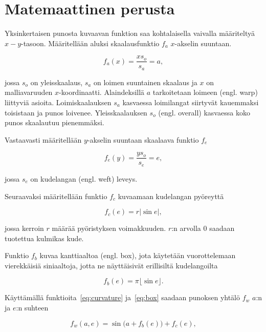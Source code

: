 \documentclass[utf8,bachelor]{gradu3}
\begin{document}
\chapter{Matemaattinen perusta}

Yksinkertaisen punosta kuvaavan funktion saa kohtalaisella vaivalla määriteltyä $x-y$-tasoon. Määritellään aluksi skaalausfunktio $f_a$ $x$-akselin suuntaan.

\begin{equation}
\label{eq:warp}
f_a(x) = \frac{xs_o}{s_a} = a,
\end{equation}

jossa $s_o$ on yleisskaalaus, $s_a$ on loimen suuntainen skaalaus ja $x$ on malliavaruuden $x$-koordinaatti. Alaindeksillä $a$ tarkoitetaan loimeen (engl. warp) liittyviä asioita. Loimiskaalauksen $s_a$ kasvaessa loimilangat siirtyvät kauemmaksi toisistaan ja punos loivenee. Yleisskaalauksen $s_o$ (engl. overall) kasvaessa koko punos skaalautuu pienemmäksi.

Vastaavasti määritellään $y$-akselin suuntaan skaalaava funktio $f_e$

\begin{equation}
\label{eq:weft}
f_e(y) = \frac{ys_o}{s_e} = e,
\end{equation}

jossa $s_e$ on kudelangan (engl. weft) leveys.

Seuraavaksi määritellään funktio $f_c$ kuvaamaan kudelangan pyöreyttä

\begin{equation}
\label{eq:curvature}
f_c(e) = r\lvert\sin{e}\rvert,
\end{equation}

jossa kerroin $r$ määrää pyöristyksen voimakkuuden. $r$:n arvolla $0$ saadaan tuotettua kulmikas kude.

Funktio $f_b$ kuvaa kanttiaaltoa (engl. box), jota käytetään vuorottelemaan vierekkäisiä siniaaltoja, jotta ne näyttäisivät erillisiltä kudelangoilta

\begin{equation}
\label{eq:box}
f_b(e) = \pi \lfloor \sin{e} \rfloor.
\end{equation}

Käyttämällä funktioita~\eqref{eq:curvature} ja~\eqref{eq:box} saadaan punoksen yhtälö $f_w$ $a$:n ja $e$:n suhteen 

\begin{equation*} 
\label{eq:weave_ae}
f_w(a,e) = \sin{\big(a + f_b(e)\big)} + f_c(e),
\end{equation*}
\end{document}
